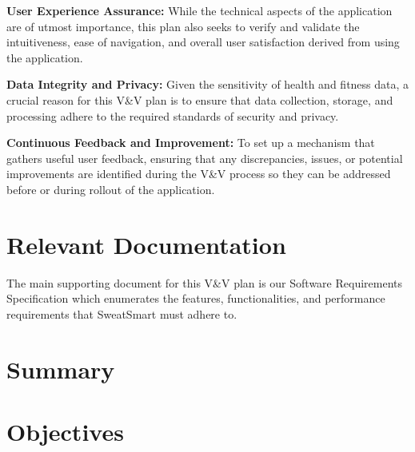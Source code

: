 \documentclass[12pt, titlepage]{article}
\begin{document}
\textbf{User Experience Assurance: }While the technical aspects of the application are of utmost importance, this plan also seeks to verify and validate the intuitiveness, ease of navigation, and overall user satisfaction derived from using the application. \newline

\textbf{Data Integrity and Privacy: }Given the sensitivity of health and fitness data, a crucial reason for this V\&V plan is to ensure that data collection, storage, and processing adhere to the required standards of security and privacy. \newline

\textbf{Continuous Feedback and Improvement: }To set up a mechanism that gathers useful user feedback, ensuring that any discrepancies, issues, or potential improvements are identified during the V\&V process so they can be addressed before or during rollout of the application. \newline

\section{Relevant Documentation}

The main supporting document for this V\&V plan is our Software Requirements Specification which enumerates the features, functionalities, and performance requirements that SweatSmart must adhere to. 

\section{Summary}


\section{Objectives}


\end{document}
